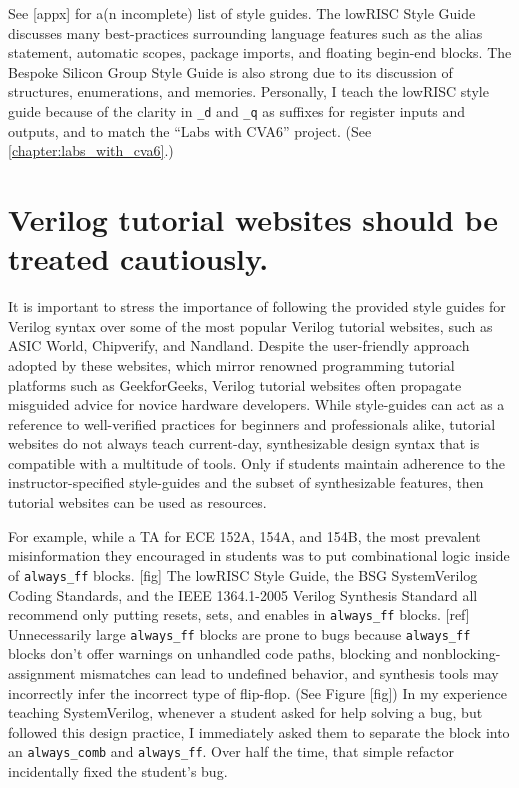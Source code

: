 See [appx] for a(n incomplete) list of style guides. The lowRISC Style Guide discusses many best-practices surrounding language features such as the alias statement, automatic scopes, package imports, and floating begin-end blocks. The Bespoke Silicon Group Style Guide is also strong due to its discussion of structures, enumerations, and memories. Personally, I teach the lowRISC style guide because of the clarity in \texttt{_d} and \texttt{_q} as suffixes for register inputs and outputs, and to match the ``Labs with CVA6'' project. (See \autoref{chapter:labs_with_cva6}.)

\section{Verilog tutorial websites should be treated cautiously.}

It is important to stress the importance of following the provided style guides for Verilog syntax over some of the most popular Verilog tutorial websites, such as ASIC World, Chipverify, and Nandland. Despite the user-friendly approach adopted by these websites, which mirror renowned programming tutorial platforms such as GeekforGeeks, Verilog tutorial websites often propagate misguided advice for novice hardware developers. While style-guides can act as a reference to well-verified practices for beginners and professionals alike, tutorial websites do not always teach current-day, synthesizable design syntax that is compatible with a multitude of tools. Only if students maintain adherence to the instructor-specified style-guides and the subset of synthesizable features, then tutorial websites can be used as resources.

For example, while a TA for ECE 152A, 154A, and 154B, the most prevalent misinformation they encouraged in students was to put combinational logic inside of \texttt{always_ff} blocks. [fig] The lowRISC Style Guide, the BSG SystemVerilog Coding Standards, and the IEEE 1364.1-2005 Verilog Synthesis Standard all recommend only putting resets, sets, and enables in \texttt{always_ff} blocks. [ref] Unnecessarily large \texttt{always_ff} blocks are prone to bugs because \texttt{always_ff} blocks don't offer warnings on unhandled code paths, blocking and nonblocking-assignment mismatches can lead to undefined behavior, and synthesis tools may incorrectly infer the incorrect type of flip-flop. (See Figure [fig]) In my experience teaching SystemVerilog, whenever a student asked for help solving a bug, but followed this design practice, I immediately asked them to separate the block into an \texttt{always_comb} and \texttt{always_ff}. Over half the time, that simple refactor incidentally fixed the student's bug.

